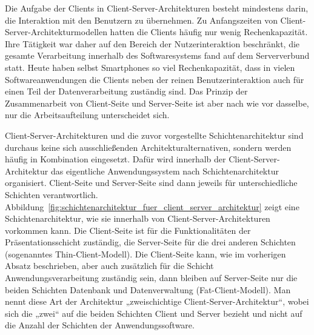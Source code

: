 Die Aufgabe der Clients 
in Client-Server-Architekturen besteht mindestens darin, die Interaktion mit den Benutzern zu übernehmen. Zu Anfangszeiten von Client-Server-Architekturmodellen hatten die Clients häufig nur wenig Rechenkapazität. Ihre Tätigkeit war daher auf den Bereich der Nutzerinteraktion beschränkt, die gesamte Verarbeitung innerhalb des Softwaresystems fand auf dem Serververbund statt. Heute haben selbst Smartphones so viel Rechenkapazität, dass in vielen Software\-anwendungen die Clients neben der reinen Benutzerinteraktion auch für einen Teil der Datenverarbeitung zuständig sind. Das Prinzip der Zusammenarbeit von Client-Seite und Server-Seite ist aber nach wie vor dasselbe, nur die Arbeitsaufteilung unterscheidet sich.

\vspace{2mm} %

Client-Server-Architekturen und die zuvor vorgestellte Schichtenarchitektur  sind durchaus keine sich ausschließenden Architekturalternativen, sondern werden häufig in Kombination eingesetzt. Dafür wird innerhalb der Client-Server-Architektur das eigentliche Anwendungssystem nach Schichtenarchitektur organisiert. Client-Seite und Server-Seite sind dann jeweils für unterschiedliche Schichten verantwortlich. Abbildung~\ref{fig:schichtenarchitektur_fuer_client_server_architektur} zeigt eine Schichtenarchitektur, wie sie innerhalb von Client-Server-Ar\-chi\-tek\-tu\-ren vorkommen kann. Die Client-Seite ist für die Funktionalitäten der Präsentationsschicht zuständig, die Server-Seite für die drei anderen Schichten (sogenanntes Thin-Client-Modell). Die Client-Seite kann, wie im vorherigen Absatz beschrieben, aber auch zusätzlich für die Schicht Anwendungsverarbeitung zuständig sein, dann bleiben auf Server-Seite nur die beiden Schichten Datenbank und Datenverwaltung (Fat-Client-Modell). Man nennt diese Art der Architektur „zweischichtige Client-Server-Architektur“, wobei sich die „zwei“ auf die beiden Schichten Client und Server bezieht und nicht auf die Anzahl der Schichten der Anwendungssoftware.

\vspace{\baselineskip} %

